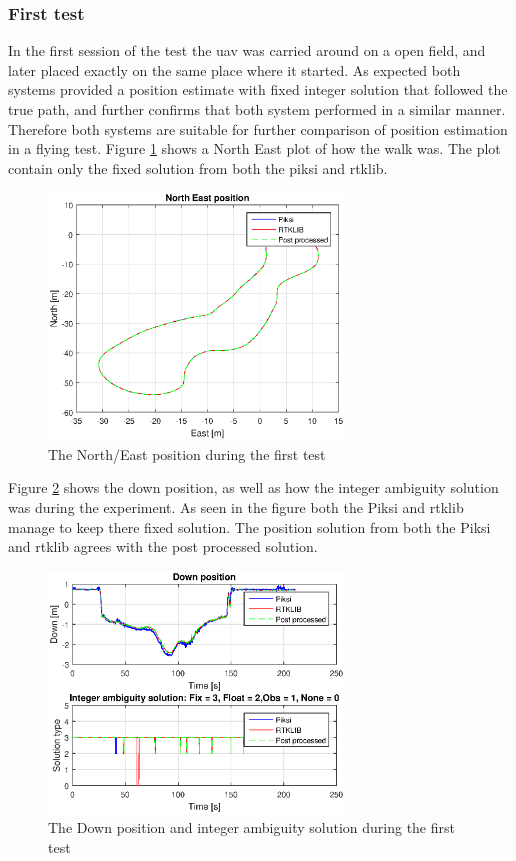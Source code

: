 \subsubsection{First test}
In the first session of the test the \gls{uav} was carried around on a open field, and later placed exactly on the same place where it started. As expected both systems provided a position estimate with fixed integer solution that followed the true path, and further confirms that both system performed in a similar manner. Therefore both systems are suitable for further comparison of position estimation in a flying test.
Figure \ref{figure:xywalk1} shows a North East plot of how the walk was. The plot contain only the fixed solution from both the piksi and rtklib. 
\begin{figure}[H]
	\centering
		\includegraphics[width=0.7\textwidth]{figs/plots/xywalk1.eps}
		\caption{The North/East position during the first test}
		\label{figure:xywalk1}
\end{figure}
Figure \ref{figure:DownAndAmbwalk1} shows the down position, as well as how the integer ambiguity solution was during the experiment. As seen in the figure both the Piksi and \gls{rtklib} manage to keep there fixed solution. The position solution from both the Piksi and \gls{rtklib} agrees with the post processed solution. 
\begin{figure}[H]
	\centering
		\includegraphics[width=0.7\textwidth]{figs/plots/downWalk1.eps}
		\caption{The Down position and integer ambiguity solution during the first test}
		\label{figure:DownAndAmbwalk1}
\end{figure}

